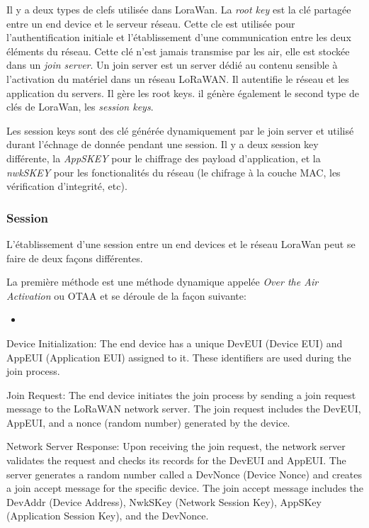 Il y a deux types de clefs utilisée dans LoraWan. La \textit{root key} est la clé partagée entre un end device et le serveur réseau. Cette cle est utilisée pour l'authentification initiale et l'établissement d'une communication entre les deux éléments du réseau. Cette clé n'est jamais transmise par les air, elle est stockée dans un \textit{join server}. Un join server est un server dédié au contenu sensible à l'activation du matériel dans un réseau LoRaWAN. Il autentifie le réseau et les application du servers. Il gère les root keys. il génère également le second type de clés de LoraWan, les \textit{session keys}.

Les session keys sont des clé générée dynamiquement par le join server et utilisé durant l'échnage de donnée pendant une session. Il y a deux session key différente, la \textit{AppSKEY} pour le chiffrage des payload d'application, et la \textit{nwkSKEY} pour les fonctionalités du réseau (le chifrage à la couche MAC, les vérification d'integrité, etc).

\subsubsection{Session}

L'établissement d'une session entre un end devices et le réseau LoraWan peut se faire de deux façons différentes.

La première méthode est une méthode dynamique appelée \textit{Over the Air Activation} ou OTAA et se déroule de la façon suivante: 
\begin{itemize}
\item 
\end{itemize}

    Device Initialization:
        The end device has a unique DevEUI (Device EUI) and AppEUI (Application EUI) assigned to it. These identifiers are used during the join process.

    Join Request:
        The end device initiates the join process by sending a join request message to the LoRaWAN network server.
        The join request includes the DevEUI, AppEUI, and a nonce (random number) generated by the device.

    Network Server Response:
        Upon receiving the join request, the network server validates the request and checks its records for the DevEUI and AppEUI.
        The server generates a random number called a DevNonce (Device Nonce) and creates a join accept message for the specific device.
        The join accept message includes the DevAddr (Device Address), NwkSKey (Network Session Key), AppSKey (Application Session Key), and the DevNonce.

